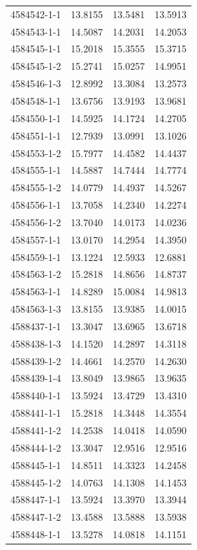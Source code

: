 \begin{longtable}{lrrr}
4584542-1-1 & 13.8155 & 13.5481 & 13.5913 \\
4584543-1-1 & 14.5087 & 14.2031 & 14.2053 \\
4584545-1-1 & 15.2018 & 15.3555 & 15.3715 \\
4584545-1-2 & 15.2741 & 15.0257 & 14.9951 \\
4584546-1-3 & 12.8992 & 13.3084 & 13.2573 \\
4584548-1-1 & 13.6756 & 13.9193 & 13.9681 \\
4584550-1-1 & 14.5925 & 14.1724 & 14.2705 \\
4584551-1-1 & 12.7939 & 13.0991 & 13.1026 \\
4584553-1-2 & 15.7977 & 14.4582 & 14.4437 \\
4584555-1-1 & 14.5887 & 14.7444 & 14.7774 \\
4584555-1-2 & 14.0779 & 14.4937 & 14.5267 \\
4584556-1-1 & 13.7058 & 14.2340 & 14.2274 \\
4584556-1-2 & 13.7040 & 14.0173 & 14.0236 \\
4584557-1-1 & 13.0170 & 14.2954 & 14.3950 \\
4584559-1-1 & 13.1224 & 12.5933 & 12.6881 \\
4584563-1-2 & 15.2818 & 14.8656 & 14.8737 \\
4584563-1-1 & 14.8289 & 15.0084 & 14.9813 \\
4584563-1-3 & 13.8155 & 13.9385 & 14.0015 \\
4588437-1-1 & 13.3047 & 13.6965 & 13.6718 \\
4588438-1-3 & 14.1520 & 14.2897 & 14.3118 \\
4588439-1-2 & 14.4661 & 14.2570 & 14.2630 \\
4588439-1-4 & 13.8049 & 13.9865 & 13.9635 \\
4588440-1-1 & 13.5924 & 13.4729 & 13.4310 \\
4588441-1-1 & 15.2818 & 14.3448 & 14.3554 \\
4588441-1-2 & 14.2538 & 14.0418 & 14.0590 \\
4588444-1-2 & 13.3047 & 12.9516 & 12.9516 \\
4588445-1-1 & 14.8511 & 14.3323 & 14.2458 \\
4588445-1-2 & 14.0763 & 14.1308 & 14.1453 \\
4588447-1-1 & 13.5924 & 13.3970 & 13.3944 \\
4588447-1-2 & 13.4588 & 13.5888 & 13.5938 \\
4588448-1-1 & 13.5278 & 14.0818 & 14.1151 \\

\end{longtable}

